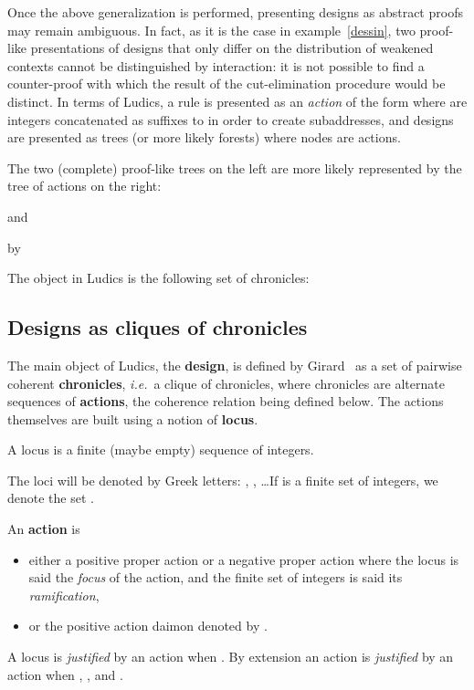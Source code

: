 \documentclass{LMCS}
\def\ie{{\em i.e.}}
\begin{document}
Once the above generalization is performed, presenting designs as abstract proofs may remain ambiguous.
In fact, as it is the case in example~\ref{dessin}, two proof-like presentations of designs that only differ on the distribution of weakened contexts cannot be distinguished by interaction: it is not possible to find a counter-proof with which the result of the cut-elimination procedure would be distinct. 
In terms of Ludics, a rule is presented as an {\em action} of the form  where  are integers concatenated as suffixes to  in order to create subaddresses,
and designs are presented as trees (or more likely forests) where nodes are actions.

\begin{exa}
The two (complete) proof-like trees on the left are more likely represented by the tree of  actions on the right:
\begin{center}

and

\hspace{.3cm}by\hspace{.3cm}
\end{center}
The object in Ludics is the following set of chronicles:


\label{dessin}
\end{exa}


\subsection{Designs as cliques of chronicles}
 The main object of Ludics, the {\bf design}, is defined by Girard~\cite{DBLP:journals/mscs/Girard01} as a set of pairwise coherent {\bf chronicles}, \ie\ a clique of chronicles, where chronicles are alternate sequences of {\bf actions}, the coherence relation being defined below. The actions themselves are built using a notion of {\bf locus}.
 
  \begin{defi}[Locus]
 A locus is a finite (maybe empty) sequence of integers.
  \end{defi}
 The loci  will be denoted by Greek letters: , , \dots If  is a finite set of integers, we denote  the set . 

 \begin{defi}[Action]
An {\bf action}  is
\begin{itemize}
\item either a positive proper action  or a negative proper action  where the locus  is said the {\em focus} of the action, and the finite set of integers  is said its {\em ramification},

\item or the positive action daimon denoted by .
\end{itemize}
 A locus  is {\em justified} by an action  when . By extension an action  is {\em justified} by an action  when , ,  and . 
\end{defi}
\end{document}
